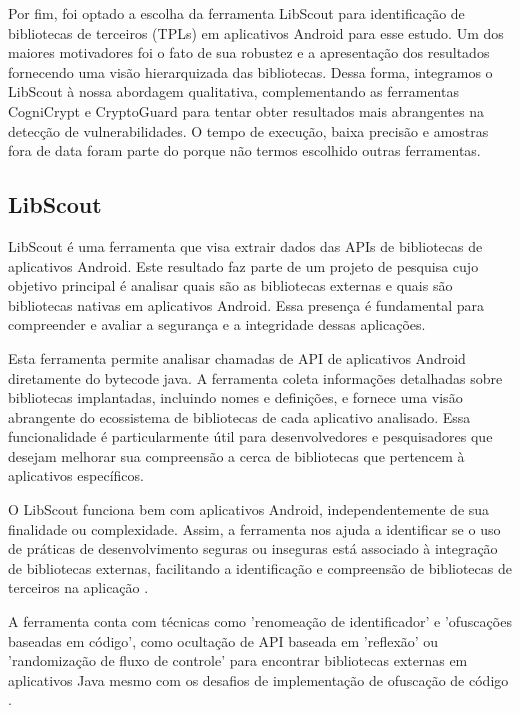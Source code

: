 Por fim, foi optado a escolha da ferramenta LibScout para identificação de bibliotecas de terceiros (TPLs) em aplicativos Android para esse estudo. Um dos maiores motivadores foi o fato de sua robustez e a apresentação dos resultados fornecendo uma visão hierarquizada das bibliotecas. Dessa forma, integramos o LibScout à nossa abordagem qualitativa, complementando as ferramentas CogniCrypt e CryptoGuard para tentar obter resultados mais abrangentes na detecção de vulnerabilidades. O tempo de execução, baixa precisão e amostras fora de data foram parte do porque não termos escolhido outras ferramentas.

\subsection{LibScout} %

LibScout é uma ferramenta que visa extrair dados das APIs de bibliotecas de aplicativos Android. \cite{LibScout} Este resultado faz parte de um projeto de pesquisa cujo objetivo principal é analisar quais são as bibliotecas externas e quais são bibliotecas nativas em aplicativos Android. \cite{LibScout} Essa presença é fundamental para compreender e avaliar a segurança e a integridade dessas aplicações.

Esta ferramenta permite analisar chamadas de API de aplicativos Android diretamente do bytecode java. \cite{LibScout} A ferramenta coleta informações detalhadas sobre bibliotecas implantadas, incluindo nomes e definições, e fornece uma visão abrangente do ecossistema de bibliotecas de cada aplicativo analisado. \cite{LibScout} Essa funcionalidade é particularmente útil para desenvolvedores e pesquisadores que desejam melhorar sua compreensão a cerca de bibliotecas que pertencem à aplicativos específicos.

O LibScout funciona bem com aplicativos Android, independentemente de sua finalidade ou complexidade. \cite{LibScout} Assim, a ferramenta nos ajuda a identificar se o uso de práticas de desenvolvimento seguras ou inseguras está associado à integração de bibliotecas externas, facilitando a identificação e compreensão de bibliotecas de terceiros na aplicação \cite{LibScout}.

A ferramenta conta com técnicas como 'renomeação de identificador'\cite{LibScout} e 'ofuscações baseadas em código', como ocultação de API baseada em 'reflexão' ou 'randomização de fluxo de controle' para encontrar bibliotecas externas em aplicativos Java mesmo com os desafios de implementação de ofuscação de código \cite{LibScout}. \cite{LibScout} 

